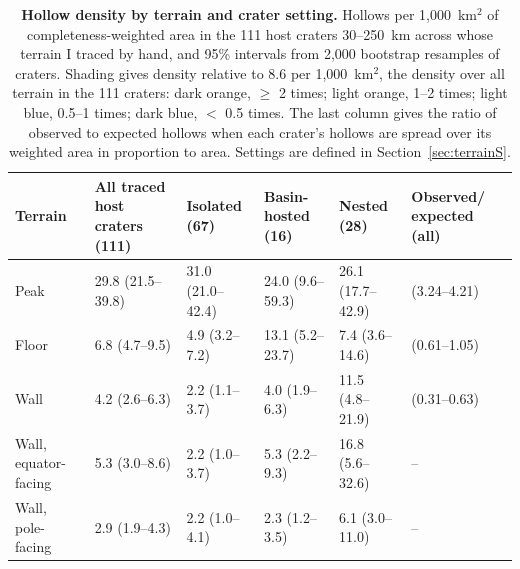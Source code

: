 \documentclass{planetary}
\begin{document}
\begin{table}[!ht]
    \mytablestyle
    \caption{{\bf Hollow density by terrain and crater setting.} Hollows per 1,000~km$^2$ of completeness-weighted area in the 111 host craters 30--250~km across whose terrain I traced by hand, and 95\% intervals from 2,000 bootstrap resamples of craters. Shading gives density relative to 8.6 per 1,000~km$^2$, the density over all terrain in the 111 craters: dark orange, $\geq$ 2 times; light orange, 1--2 times; light blue, 0.5--1 times; dark blue, $<$ 0.5 times. The last column gives the ratio of observed to expected hollows when each crater's hollows are spread over its weighted area in proportion to area. Settings are defined in Section~\ref{sec:terrainS}.}
    \footnotesize{
        \begin{tabularx}{\textwidth}{>{\raggedright\arraybackslash}p{1.9cm} >{\raggedright\arraybackslash}X >{\raggedright\arraybackslash}X >{\raggedright\arraybackslash}X >{\raggedright\arraybackslash}X >{\raggedright\arraybackslash}p{2.3cm}}
            \toprule
            \textbf{Terrain} & \textbf{All traced host craters (111)} & \textbf{Isolated (67)} & \textbf{Basin-hosted (16)} & \textbf{Nested (28)} & \textbf{Observed/ expected (all)} \\
            \hline
            Peak & \cellcolor[HTML]{F0B08F}29.8 (21.5--39.8) & \cellcolor[HTML]{F0B08F}31.0 (21.0--42.4) & \cellcolor[HTML]{F0B08F}24.0 (9.6--59.3) & \cellcolor[HTML]{F0B08F}26.1 (17.7--42.9) & 3.66 (3.24--4.21) \\
            Floor & \cellcolor[HTML]{DCE7F3}6.8 (4.7--9.5) & \cellcolor[HTML]{DCE7F3}4.9 (3.2--7.2) & \cellcolor[HTML]{FBE3D6}13.1 (5.2--23.7) & \cellcolor[HTML]{DCE7F3}7.4 (3.6--14.6) & 0.81 (0.61--1.05) \\
            Wall & \cellcolor[HTML]{AFC8E6}4.2 (2.6--6.3) & \cellcolor[HTML]{AFC8E6}2.2 (1.1--3.7) & \cellcolor[HTML]{AFC8E6}4.0 (1.9--6.3) & \cellcolor[HTML]{FBE3D6}11.5 (4.8--21.9) & 0.46 (0.31--0.63) \\
            Wall, equator-facing & \cellcolor[HTML]{DCE7F3}5.3 (3.0--8.6) & \cellcolor[HTML]{AFC8E6}2.2 (1.0--3.7) & \cellcolor[HTML]{DCE7F3}5.3 (2.2--9.3) & \cellcolor[HTML]{FBE3D6}16.8 (5.6--32.6) & -- \\
            Wall, pole-facing & \cellcolor[HTML]{AFC8E6}2.9 (1.9--4.3) & \cellcolor[HTML]{AFC8E6}2.2 (1.0--4.1) & \cellcolor[HTML]{AFC8E6}2.3 (1.2--3.5) & \cellcolor[HTML]{DCE7F3}6.1 (3.0--11.0) & -- \\
            \hline
        \end{tabularx}}
    \label{tab:terrain}
\end{table}
\end{document}
